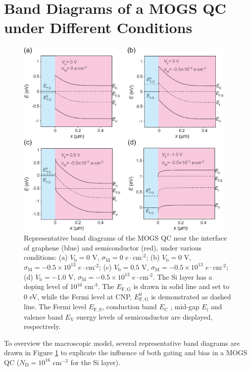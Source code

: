 \documentclass[manuscript=suppinfo]{achemso}
\newcommand*\subs[1]{_{\text{#1}}} %
\newcommand*\sups[1]{^{\text{#1}}} %
\begin{document}
\newpage
\section{Band Diagrams of a MOGS QC under Different Conditions}
\begin{figure}[h!]
  \centering
  \includegraphics[width=0.95\textwidth]{img/energy_diagram.eps}
  \caption{Representative band  diagrams of the MOGS QC near the interface of graphene (blue) and semiconductor (red), under various conditions: (a) $V\subs{b}=0$ V, $\sigma\subs{M}=0$ $e\cdot$cm$\sups{-2}$; (b) $V\subs{b}=0$ V, $\sigma\subs{M}=-0.5\times10^{13}$ $e\cdot$cm$\sups{-2}$; (c) $V\subs{b}=0.5$ V, $\sigma\subs{M}=-0.5\times10^{13}$ $e\cdot$cm$\sups{-2}$; (d) $V\subs{b}=-1.0$ V, $\sigma\subs{M}=-0.5\times10^{13}$ $e\cdot$cm$\sups{-2}$. The Si layer has a doping level of 10$\sups{16}$ cm$\sups{-3}$. The $E_{\mathrm{F,G}}$ is drawn in solid line and set to 0 eV, while the Fermi level at CNP, $E_{\mathrm{F,G}}^0$ is demonstrated as dashed line.  The Fermi level   $E_{\mathrm {F,S}}$, conduction band $E\subs{C}$ ,  mid-gap $E\subs{i}$  and  valence band $E\subs{V}$ energy levels of semiconductor are displayed, respectively.}
  \label{fig:energy-diagram}
\end{figure}
To overview the macroscopic model, several representative band diagrams are drawn in Figure \ref{fig:energy-diagram} to explicate the influence of both gating and bias in a MOGS QC ($N\subs{D}=10^{16}$ cm$^{-3}$ for the Si layer).
\end{document}
